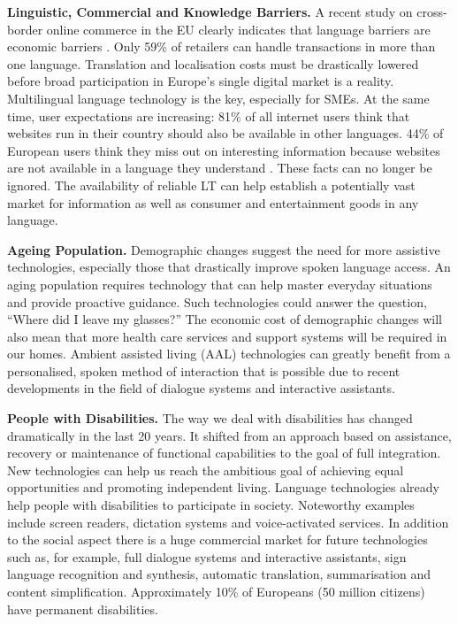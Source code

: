 \documentclass[10pt, plain]{../../metanetpaper}
\begin{document}
\begin{multicols}{2}
\textbf{Linguistic, Commercial and Knowledge Barriers.} A recent study on cross-border online commerce in the EU clearly indicates that language barriers are economic barriers \cite{EC4}. Only 59\% of retailers can handle transactions in more than one language. Translation and localisation costs must be drastically lowered before broad participation in Europe’s single digital market is a reality. Multilingual language technology is the key, especially for SMEs. At the same time, user expectations are increasing: 81\% of all internet users think that websites run in their country should also be available in other languages. 44\% of European users think they miss out on interesting information because websites are not available in a language they understand \cite{EC1}. These facts can no longer be ignored. The availability of reliable LT can help establish a potentially vast market for information as well as consumer and entertainment goods in any language.

\textbf{Ageing Population.} Demographic changes suggest the need for more assistive technologies, especially those that drastically improve spoken language access. An aging population requires technology that can help master everyday situations and provide proactive guidance. Such technologies could answer the question, “Where did I leave my glasses?” The economic cost of demographic changes will also mean that more health care services and support systems will be required in our homes. Ambient assisted living (AAL) technologies can greatly benefit from a personalised, spoken method of interaction that is possible due to recent developments in the field of dialogue systems and interactive assistants.

\textbf{People with Disabilities.} The way we deal with disabilities has changed dramatically in the last 20 years. It shifted from an approach based on assistance, recovery or maintenance of functional capabilities to the goal of full integration. New technologies can help us reach the ambitious goal of achieving equal opportunities and promoting independent living. Language technologies already help people with disabilities to participate in society. Noteworthy examples include screen readers, dictation systems and voice-activated services. In addition to the social aspect there is a huge commercial market for future technologies such as, for example, full dialogue systems and interactive assistants, sign language recognition and synthesis, automatic translation, summarisation and content simplification. Approximately 10\% of Europeans (50 million citizens) have permanent disabilities.


\end{multicols}
\end{document}
